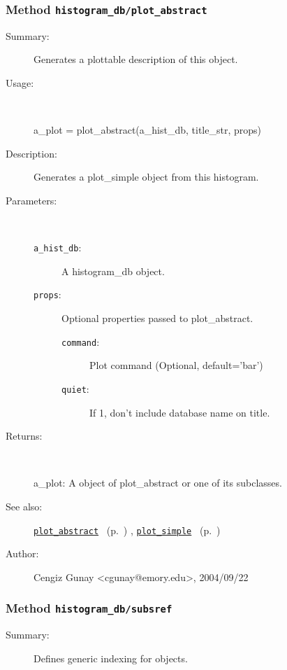 \subsubsection[Method \texttt{plot\_abstract}]{Method \texttt{histogram\_db/plot\_abstract}}%
%
\label{ref_histogram_db__plot_abstract}%
\hypertarget{ref_histogram_db__plot_abstract}{}%
\begin{description}
\item[Summary:]Generates a plottable description of this object.
%
\item[Usage:]~%
\begin{lyxcode}%
a\_plot = plot\_abstract(a\_hist\_db, title\_str, props)
%
\end{lyxcode}%
%
\item[Description:]%
Generates a plot\_simple object from this histogram.
\item[Parameters:]~
\begin{description}%
\item[\texttt{a\_hist\_db}:]
 A histogram\_db object.
\item[\texttt{props}:]
 Optional properties passed to plot\_abstract.
\begin{description}%
\item[\texttt{command}:]
 Plot command (Optional, default='bar')
\item[\texttt{quiet}:]
 If 1, don't include database name on title.
\end{description}%
\end{description}%
%
\item[Returns:]~

	a\_plot: A object of plot\_abstract or one of its subclasses.
%
%
\item[See also:]%
\hyperlink{ref_plot_abstract}{\texttt{plot\_abstract}}%
\ (p.~\pageref{ref_plot_abstract})%
%
, \hyperlink{ref_plot_simple}{\texttt{plot\_simple}}%
\ (p.~\pageref{ref_plot_simple})%
%
%
\item[Author:]%
Cengiz Gunay <cgunay@emory.edu>, 2004/09/22%
\end{description}
\methodline%
\subsubsection[Method \texttt{subsref}]{Method \texttt{histogram\_db/subsref}}%
%
\label{ref_histogram_db__subsref}%
\hypertarget{ref_histogram_db__subsref}{}%
\begin{description}
\item[Summary:]Defines generic indexing for objects.
%
%
%
%
%
%
%
%
\end{description}
\methodline%
